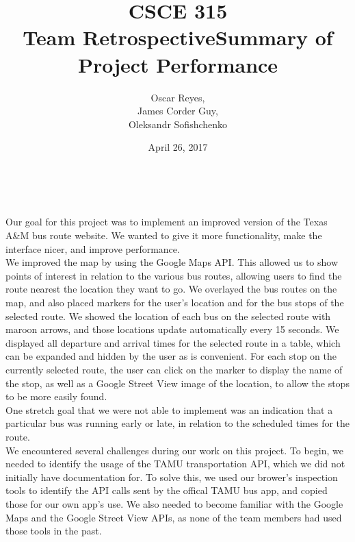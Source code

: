 \documentclass[12pt]{report}
\title{CSCE 315 \\ Team Retrospective}
\author{Oscar Reyes,\\
	James Corder Guy,\\
	Oleksandr Sofishchenko}
\date{April 26, 2017}
\begin{document}
	
	\maketitle
	
	\newpage
	
	\begin{center}
		\title{\textbf{Summary of Project Performance}} \\
	\end{center}
	
	Our goal for this project was to implement an improved version of the Texas A\&M bus route website. We wanted to give it more functionality, make the interface nicer, and improve performance. \\
	
    We improved the map by using the Google Maps API. This allowed us to show points of interest in relation to the various bus routes, allowing users to find the route nearest the location they want to go. We overlayed the bus routes on the map, and also placed markers for the user's location and for the bus stops of the selected route. We showed the location of each bus on the selected route with maroon arrows, and those locations update automatically every 15 seconds. We displayed all departure and arrival times for the selected route in a table, which can be expanded and hidden by the user as is convenient. For each stop on the currently selected route, the user can click on the marker to display the name of the stop, as well as a Google Street View image of the location, to allow the stops to be more easily found. \\
	
    One stretch goal that we were not able to implement was an indication that a particular bus was running early or late, in relation to the scheduled times for the route. \\

    We encountered several challenges during our work on this project. To begin, we needed to identify the usage of the TAMU transportation API, which we did not initially have documentation for. To solve this, we used our brower's inspection tools to identify the API calls sent by the offical TAMU bus app, and copied those for our own app's use. We also needed to become familiar with the Google Maps and the Google Street View APIs, as none of the team members had used those tools in the past. \\
\end{document}
